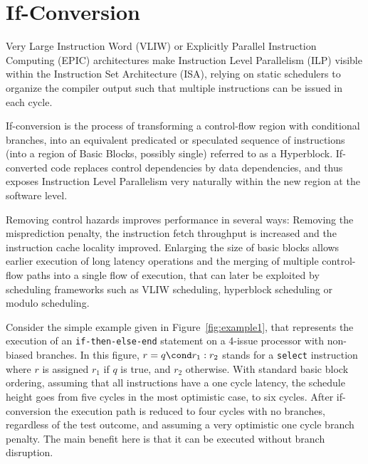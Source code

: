 \chapter{If-Conversion }
\label{chapter:if_conversion}

\newcommand{\annotation}[1]{%
  \marginpar{\small\itshape\color{red}#1}}




 Very Large Instruction Word (VLIW) or Explicitly Parallel Instruction Computing (EPIC) architectures make Instruction Level Parallelism (ILP) visible within the Instruction Set Architecture (ISA), relying on static schedulers to organize the compiler output such that multiple instructions can be issued in each cycle.

If-conversion is the process of transforming a control-flow region with conditional branches, into an equivalent predicated or speculated sequence of instructions (into a region of Basic Blocks, possibly single) referred to as a Hyperblock. 
If-converted code replaces control dependencies by data dependencies, and thus exposes Instruction Level Parallelism very naturally within the new region at the software level.

Removing control hazards improves performance in several ways: 
Removing the misprediction penalty, the instruction fetch throughput is increased and the instruction cache locality improved. 
Enlarging the size of basic blocks allows earlier execution of long latency operations and the merging of multiple control-flow paths into a single flow of execution, that can later be exploited by scheduling frameworks such as VLIW scheduling, hyperblock scheduling or modulo scheduling.

Consider the simple example given in Figure~\ref{fig:example1}, that represents the execution of an \texttt{if-then-else-end} statement on a 4-issue processor with non-biased branches. 
In this figure, $r=q\cond r_1:r_2$ stands for a \texttt{select} instruction where $r$ is assigned $r_1$ if $q$ is true, and $r_2$ otherwise. 
With standard basic block ordering, assuming that all instructions have a one cycle latency, the schedule height goes from five cycles in the most optimistic case, to six cycles. 
After if-conversion the execution path is reduced to four cycles with no branches, regardless of the test outcome, and assuming a very optimistic one cycle branch penalty. 
The main benefit here is that it can be executed without branch disruption.

